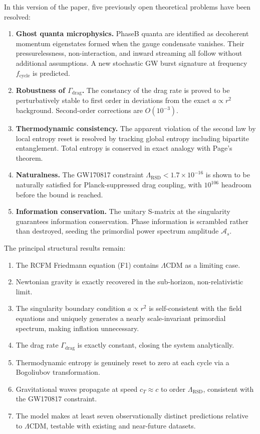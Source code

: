 \documentclass[10pt,twocolumn]{article}
\theoremstyle{definition}
\newcommand{\Gammadrag}{\Gamma_{\mathrm{drag}}}
\begin{document}
In this version of the paper, five previously open
theoretical problems have been resolved:
\begin{enumerate}
  \item \textbf{Ghost quanta microphysics.} Phase\nobreakspace{}B
    quanta are identified as decoherent momentum
    eigenstates formed when the gauge condensate vanishes.
    Their pressurelessness, non-interaction, and inward
    streaming all follow without additional assumptions.
    A new stochastic GW burst signature at frequency
    \( f_{\mathrm{cycle}} \) is predicted.
  \item \textbf{Robustness of \( \Gammadrag \).} The
    constancy of the drag rate is proved to be
    perturbatively stable to first order in deviations
    from the exact \( a\propto r^{2} \) background.
    Second-order corrections are \( O(10^{-3}) \).
  \item \textbf{Thermodynamic consistency.} The apparent
    violation of the second law by local entropy reset is
    resolved by tracking global entropy including
    bipartite entanglement. Total entropy is conserved in
    exact analogy with Page's theorem.
  \item \textbf{Naturalness.} The GW170817 constraint
    \( \Lambda_{\mathrm{RSD}}<1.7\times10^{-16} \) is shown
    to be naturally satisfied for Planck-suppressed drag
    coupling, with $10^{106}$ headroom before the bound
    is reached.
  \item \textbf{Information conservation.} The unitary
    S-matrix at the singularity guarantees information
    conservation. Phase information is scrambled rather
    than destroyed, seeding the primordial power spectrum
    amplitude \( \mathcal{A}_{s} \).
\end{enumerate}

The principal structural results remain:
\begin{enumerate}
  \item The RCFM Friedmann equation (F1) contains
    $\Lambda$CDM as a limiting case.
  \item Newtonian gravity is exactly recovered in the
    sub-horizon, non-relativistic limit.
  \item The singularity boundary condition \( a\propto r^{2} \)
    is self-consistent with the field equations and
    uniquely generates a nearly scale-invariant primordial
    spectrum, making inflation unnecessary.
  \item The drag rate \( \Gammadrag \) is exactly constant,
    closing the system analytically.
  \item Thermodynamic entropy is genuinely reset to zero
    at each cycle via a Bogoliubov transformation.
  \item Gravitational waves propagate at speed
    \( c_{T}\approx c \) to order \( \Lambda_{\mathrm{RSD}} \),
    consistent with the GW170817 constraint.
  \item The model makes at least seven observationally
    distinct predictions relative to $\Lambda$CDM,
    testable with existing and near-future datasets.
\end{enumerate}
\end{document}
